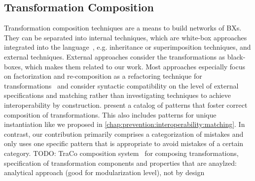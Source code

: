 \subsection*{Transformation Composition}
Transformation composition techniques are a means to build networks of \acp{BX}.
They can be separated into internal techniques, which are white-box approaches integrated into the language~\cite{wagelaar2008a, wagelaar2010a, wagelaar2011a}, e.g. inheritance or superimposition techniques, and external techniques.
External approaches consider the transformations as black-boxes, which makes them related to our work.
Most approaches especially focus on factorization and re-composition as a refactoring technique for transformations~\cite{cuadrado2008a} and consider syntactic compatibility on the level of external specifications and matching \metamodels rather than investigating techniques to achieve interoperability by construction.
\textcite{lano2014a} present a catalog of patterns that foster correct composition of transformations.
This also includes patterns for unique instantiation like we proposed in \autoref{chap:prevention:interoperability:matching}.
In contrast, our contribution primarily comprises a categorization of mistakes %
and only uses one specific pattern that is appropriate to avoid mistakes of a certain category. %
TODO: TraCo composition system~\cite{heidenreich2010composition} for composing transformations, specification of transformation components and properties that are anaylzed: analytical approach (good for modularization level), not by design



